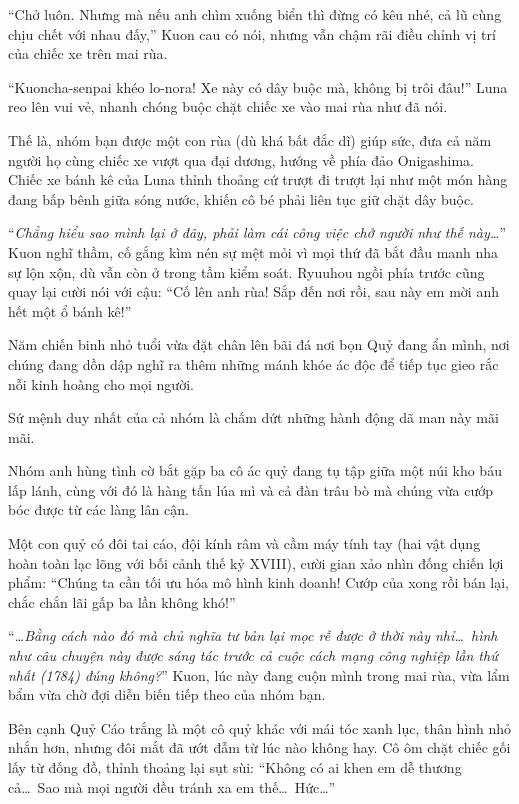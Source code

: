 \documentclass[../main.tex]{subfiles}
\begin{document}
``Chở luôn. Nhưng mà nếu anh chìm xuống biển thì đừng có kêu nhé, cả lũ cùng chịu chết với nhau đấy,'' Kuon cau có nói, nhưng vẫn chậm rãi điều chỉnh vị trí của chiếc xe trên mai rùa.

``Kuoncha-senpai khéo lo-nora! Xe này có dây buộc mà, không bị trôi đâu!'' Luna reo lên vui vẻ, nhanh chóng buộc chặt chiếc xe vào mai rùa như đã nói.

Thế là, nhóm bạn được một con rùa (dù khá bất đắc dĩ) giúp sức, đưa cả năm người họ cùng chiếc xe vượt qua đại dương, hướng về phía đảo Onigashima. Chiếc xe bánh kê của Luna thỉnh thoảng cứ trượt đi trượt lại như một món hàng đang bấp bênh giữa sóng nước, khiến cô bé phải liên tục giữ chặt dây buộc.

``\textit{Chẳng hiểu sao mình lại ở đây, phải làm cái công việc chở người như thế này\dots}'' Kuon nghĩ thầm, cố gắng kìm nén sự mệt mỏi vì mọi thứ đã bắt đầu manh nha sự lộn xộn, dù vẫn còn ở trong tầm kiểm soát. Ryuuhou ngồi phía trước cũng quay lại cười nói với cậu: ``Cố lên anh rùa! Sắp đến nơi rồi, sau này em mời anh hết một ổ bánh kê!''

\ct

Năm chiến binh nhỏ tuổi vừa đặt chân lên bãi đá nơi bọn Quỷ đang ẩn mình, nơi chúng đang dồn dập nghĩ ra thêm những mánh khóe ác độc để tiếp tục gieo rắc nỗi kinh hoàng cho mọi người.

Sứ mệnh duy nhất của cả nhóm là chấm dứt những hành động dã man này mãi mãi.

Nhóm anh hùng tình cờ bắt gặp ba cô ác quỷ đang tụ tập giữa một núi kho báu lấp lánh, cùng với đó là hàng tấn lúa mì và cả đàn trâu bò mà chúng vừa cướp bóc được từ các làng lân cận.

Một con quỷ có đôi tai cáo, đội kính râm và cầm máy tính tay (hai vật dụng hoàn toàn lạc lõng với bối cảnh thế kỷ XVIII), cười gian xảo nhìn đống chiến lợi phẩm: ``Chúng ta cần tối ưu hóa mô hình kinh doanh! Cướp của xong rồi bán lại, chắc chắn lãi gấp ba lần không khó!''

``\textit{\dots Bằng cách nào đó mà chủ nghĩa tư bản lại mọc rễ được ở thời này nhỉ\dots\ hình như câu chuyện này được sáng tác trước cả cuộc cách mạng công nghiệp lần thứ nhất (1784) đúng không?}'' Kuon, lúc này đang cuộn mình trong mai rùa, vừa lẩm bẩm vừa chờ đợi diễn biến tiếp theo của nhóm bạn.

Bên cạnh Quỷ Cáo trắng là một cô quỷ khác với mái tóc xanh lục, thân hình nhỏ nhắn hơn, nhưng đôi mắt đã ướt đẫm từ lúc nào không hay. Cô ôm chặt chiếc gối lấy từ đống đồ, thỉnh thoảng lại sụt sùi: ``Không có ai khen em dễ thương cả\dots\ Sao mà mọi người đều tránh xa em thế\dots\ Hức\dots''
\end{document}
